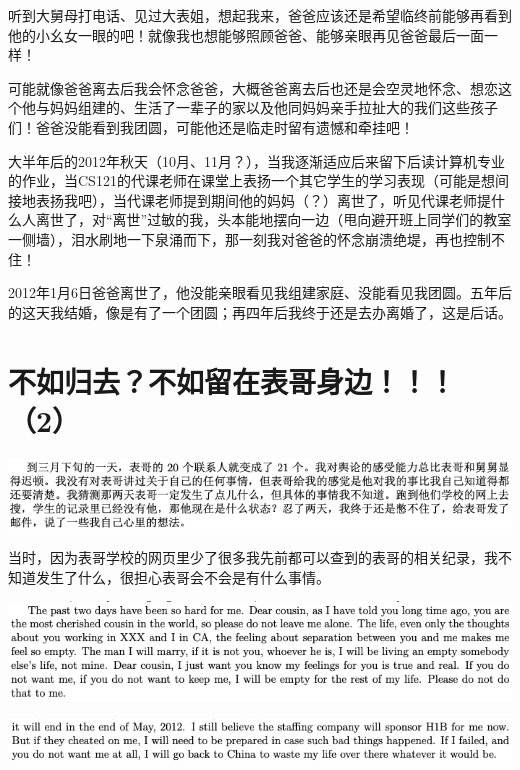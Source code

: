 \documentclass[9pt, b5paper]{article}
\begin{document}
听到大舅母打电话、见过大表姐，想起我来，爸爸应该还是希望临终前能够再看到他的小幺女一眼的吧！就像我也想能够照顾爸爸、能够亲眼再见爸爸最后一面一样！

可能就像爸爸离去后我会怀念爸爸，大概爸爸离去后也还是会空灵地怀念、想恋这个他与妈妈组建的、生活了一辈子的家以及他同妈妈亲手拉扯大的我们这些孩子们！爸爸没能看到我团圆，可能他还是临走时留有遗憾和牵挂吧！

大半年后的2012年秋天（10月、11月？），当我逐渐适应后来留下后读计算机专业的作业，当CS121的代课老师在课堂上表扬一个其它学生的学习表现（可能是想间接地表扬我吧），当代课老师提到期间他的妈妈（？）离世了，听见代课老师提什么人离世了，对“离世”过敏的我，头本能地摆向一边（甩向避开班上同学们的教室一侧墙），泪水刷地一下泉涌而下，那一刻我对爸爸的怀念崩溃绝堤，再也控制不住！

2012年1月6日爸爸离世了，他没能亲眼看见我组建家庭、没能看见我团圆。五年后的这天我结婚，像是有了一个团圆；再四年后我终于还是去办离婚了，这是后话。 

\section{不如归去？不如留在表哥身边！！！（2）}
\label{sec:org5b74c39}

\begin{center}
\includegraphics[width=.9\linewidth]{./pic/backups_plans_20210415_111452.png}
\end{center}

当时，因为表哥学校的网页里少了很多我先前都可以查到的表哥的相关纪录，我不知道发生了什么，很担心表哥会不会是有什么事情。

\begin{center}
\includegraphics[width=.9\linewidth]{./pic/backups_plans_20210415_105943.png}
\end{center}

\begin{center}
\includegraphics[width=.9\linewidth]{./pic/backups_plans_20210415_110050.png}
\end{center}
\end{document}
